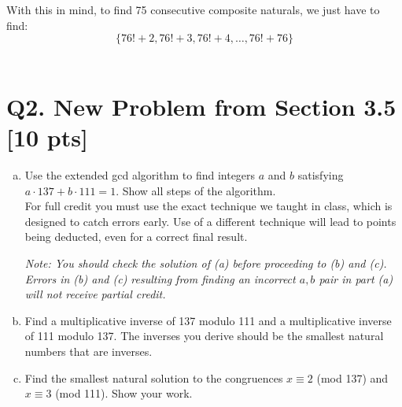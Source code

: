 \documentclass[12pt]{article}
\begin{document}
	With this in mind, to find 75 consecutive composite naturals, we just have to
	find:
	\[
		\{76!+2,76!+3,76!+4,\ldots,76!+76\}
	\]\\

	\newpage

	\section*{\textbf{Q2. New Problem from Section 3.5} [10 pts]}
	\begin{enumerate}[(a)]
		\item Use the extended gcd algorithm to find integers $a$ and $b$ satisfying
			$a \cdot 137 + b \cdot 111 = 1$. Show all steps of the algorithm. \\
			For full credit you must use the exact technique we taught in class, which
			is designed to catch errors early. Use of a different technique will lead to
			points being deducted, even for a correct final result.

			{\em \small Note: You should check the solution of (a) before proceeding to (b) and (c). Errors in (b) and (c) resulting from finding an incorrect $a,b$ pair in part (a) will not receive partial credit. }

		\item Find a multiplicative inverse of 137 modulo 111 and a multiplicative inverse
			of 111 modulo 137. The inverses you derive should be the smallest natural numbers
			that are inverses.

		\item Find the smallest natural solution to the congruences $x \equiv 2$ (mod
			137) and $x \equiv 3$ (mod 111). Show your work.
	\end{enumerate}
\end{document}
